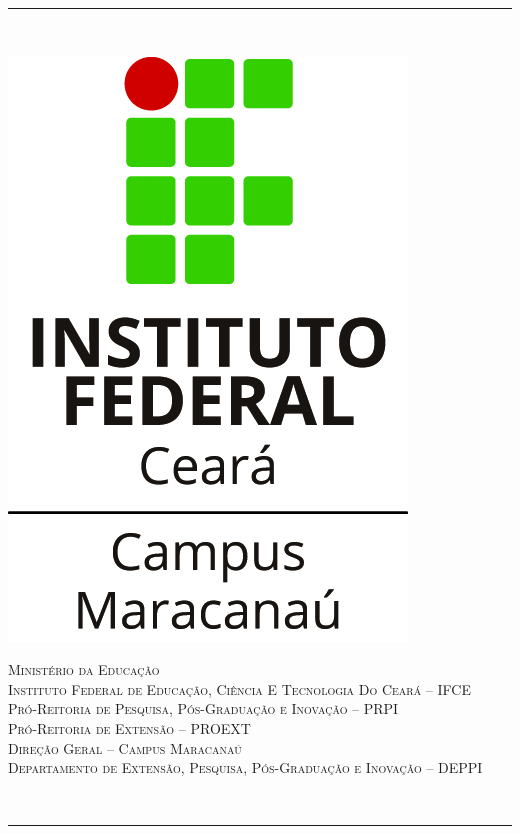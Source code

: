 \documentclass[12pt]{article}
\begin{document}
\begin{titlepage}
\newcommand{\HRule}{\rule{\linewidth}{0.5mm}} %


\thispagestyle{empty}
\noindent\HRule \\[0.4cm]
\hspace{0.1\textwidth}
\begin{minipage}{0.15\textwidth}
\includegraphics[scale=0.17]{./logo-V-cor.jpg}
\end{minipage}
\begin{minipage}{1.2\textwidth}
{\small
\textsc{Ministério da Educação\\
Instituto Federal de Educação, Ciência E Tecnologia Do Ceará – IFCE\\
Pró-Reitoria de Pesquisa, Pós-Graduação e Inovação – PRPI\\
Pró-Reitoria de Extensão – PROEXT\\
Direção Geral – Campus Maracanaú\\
Departamento de Extensão, Pesquisa, Pós-Graduação e Inovação – DEPPI}
}
\end{minipage}
\\[0.4cm]
\HRule \\[1.5cm]
 

\end{titlepage}
\end{document}
